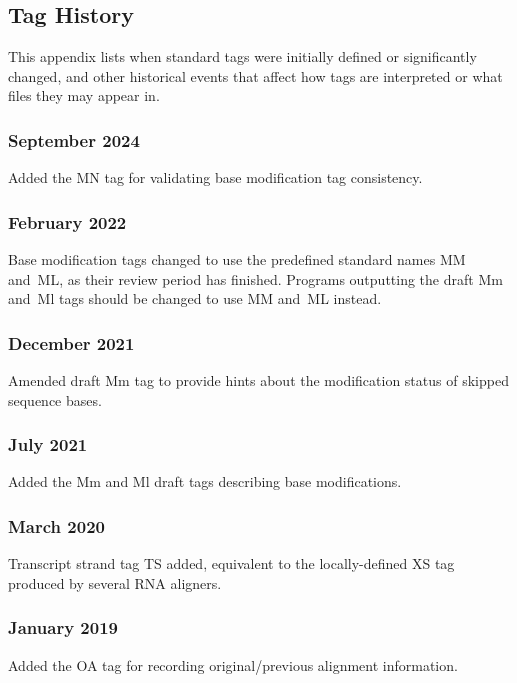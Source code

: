\documentclass[10pt]{article}
\begin{document}
\begin{appendices}
\appendix
\section{Tag History}

This appendix lists when standard tags were initially defined or significantly changed, and other historical events that affect how tags are interpreted or what files they may appear in.

\setlength{\parindent}{0pt}
\newcommand*{\gap}{\vspace*{2ex}}

\subsubsection*{September 2024}

Added the MN tag for validating base modification tag consistency.

\subsubsection*{February 2022}

Base modification tags changed to use the predefined standard names MM and~ML, as their review period has finished.
Programs outputting the draft Mm and~Ml tags should be changed to use MM and~ML instead.

\subsubsection*{December 2021}

Amended draft Mm tag to provide hints about the modification status of skipped sequence bases.

\subsubsection*{July 2021}
Added the Mm and Ml draft tags describing base modifications.

\subsubsection*{March 2020}

Transcript strand tag TS added, equivalent to the locally-defined XS tag
produced by several RNA aligners.

\subsubsection*{January 2019}
Added the OA tag for recording original/previous alignment information.


\end{appendices}
\end{document}
